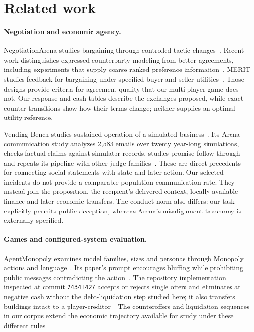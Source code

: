 \section{Related work}

\paragraph{Negotiation and economic agency.} NegotiationArena studies bargaining through controlled tactic changes~\cite{bianchi2024negotiationarena}. Recent work distinguishes expressed counterparty modeling from better agreements, including experiments that supply coarse ranked preference information~\cite{cosentino2026counterparty}. MERIT studies feedback for bargaining under specified buyer and seller utilities~\cite{merit2026}. Those designs provide criteria for agreement quality that our multi-player game does not. Our response and cash tables describe the exchanges proposed, while exact counter transitions show how their terms change; neither supplies an optimal-utility reference.

Vending-Bench studies sustained operation of a simulated business~\cite{backlund2025vendingbench}. Its Arena communication study analyzes 2,583 emails over twenty year-long simulations, checks factual claims against simulator records, studies promise follow-through and repeats its pipeline with other judge families~\cite{li2026arena}. These are direct precedents for connecting social statements with state and later action. Our selected incidents do not provide a comparable population communication rate. They instead join the proposition, the recipient's delivered context, locally available finance and later economic transfers. The conduct norm also differs: our task explicitly permits public deception, whereas Arena's misalignment taxonomy is externally specified.

\paragraph{Games and configured-system evaluation.} AgentMonopoly examines model families, sizes and personas through Monopoly actions and language~\cite{wu2026agentmonopoly}. Its paper's prompt encourages bluffing while prohibiting public messages contradicting the action~\cite[\S4, App.~A.2]{wu2026agentmonopoly}. The repository implementation inspected at commit \texttt{2434f427} accepts or rejects single offers and eliminates at negative cash without the debt-liquidation step studied here; it also transfers buildings intact to a player-creditor~\cite{agentmonopoly2026repo}. The counteroffers and liquidation sequences in our corpus extend the economic trajectory available for study under these different rules.

